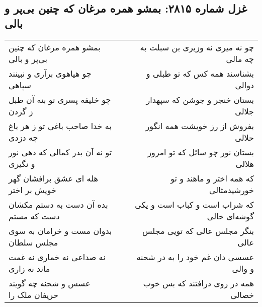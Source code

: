 \begin{center}
\section*{غزل شماره ۲۸۱۵: بمشو همره مرغان که چنین بی‌پر و بالی}
\label{sec:2815}
\begin{longtable}{l p{0.5cm} r}
بمشو همره مرغان که چنین بی‌پر و بالی
&&
چو نه میری نه وزیری بن سبلت به چه مالی
\\
چو هیاهوی برآری و نبینند سپاهی
&&
بشناسند همه کس که تو طبلی و دوالی
\\
چو خلیفه پسری تو بنه آن طبل ز گردن
&&
بستان خنجر و جوشن که سپهدار جلالی
\\
به خدا صاحب باغی تو ز هر باغ چه دزدی
&&
بفروش از رز خویشت همه انگور حلالی
\\
تو نه آن بدر کمالی که دهی نور و نگیری
&&
بستان نور چو سائل که تو امروز هلالی
\\
هله ای عشق برافشان گهر خویش بر اختر
&&
که همه اختر و ماهند و تو خورشیدمثالی
\\
بده آن دست به دستم مکشان دست که مستم
&&
که شراب است و کباب است و یکی گوشه‌ای خالی
\\
بدوان مست و خرامان به سوی مجلس سلطان
&&
بنگر مجلس عالی که تویی مجلس عالی
\\
نه صداعی نه خماری نه غمت ماند نه زاری
&&
عسسی دان غم خود را به در شحنه و والی
\\
عسس و شحنه چه گویند حریفان ملک را
&&
همه در روی درافتند که بس خوب خصالی
\\
\end{longtable}
\end{center}
